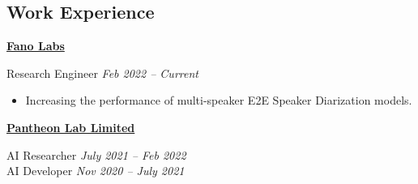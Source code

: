 \documentclass[10pt]{article} %
\begin{document}
\begin{changemargin}{0pt}{0.5pt} %

\begin{minipage}[t]{0.5\textwidth} %
\vspace{0pt} %


\section{Work Experience}

\begin{changemargin}{1pt}{1pt}

\underline{\textbf{Fano Labs}}\\
\par
\vspace{-10pt}
Research Engineer \hfill \textit{Feb 2022 -- Current}\\
\vspace{-15pt}

\begin{itemize} \itemsep-2pt %
	\item Increasing the performance of multi-speaker E2E Speaker Diarization models.
\end{itemize}



\vspace{5pt}
\underline{\textbf{Pantheon Lab Limited}}\\
\par
\vspace{-10pt}
AI Researcher \hfill \textit{July 2021 -- Feb 2022}\\

\vspace{-15pt}
AI Developer \hfill \textit{Nov 2020 -- July 2021}\\
\vspace{-15pt}


\end{changemargin}
\end{minipage}
\end{changemargin}
\end{document}
